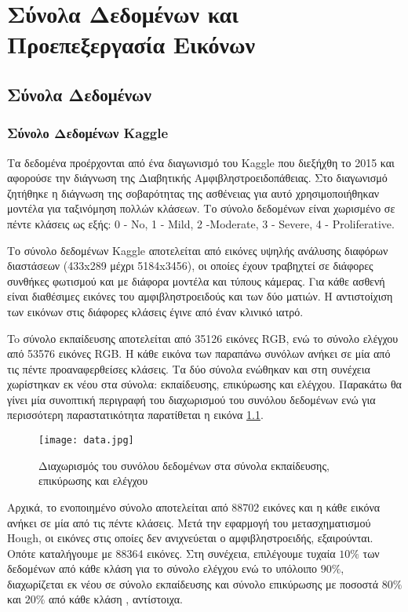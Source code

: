 \thispagestyle{plain}
\chapter{Σύνολα Δεδομένων και Προεπεξεργασία Εικόνων}
\label{chap:4}
\section{Σύνολα Δεδομένων}
\label{sec:4.1}

\subsection{Σύνολο Δεδομένων Kaggle}
\label{subsec:4.1.1}
Τα δεδομένα προέρχονται από ένα διαγωνισμό του Κaggle που διεξήχθη το 2015 και αφορούσε την διάγνωση της Διαβητικής Αμφιβληστροειδοπάθειας\cite{Kaggle}. Στο διαγωνισμό ζητήθηκε η διάγνωση της σοβαρότητας της ασθένειας για αυτό χρησιμοποιήθηκαν μοντέλα για ταξινόμηση πολλών κλάσεων. Το σύνολο δεδομένων είναι χωρισμένο σε πέντε κλάσεις ως εξής: 0 - No, 1 - Mild, 2 -Moderate, 3 - Severe, 4 - Proliferative.

Το σύνολο δεδομένων Kaggle αποτελείται από εικόνες υψηλής ανάλυσης διαφόρων διαστάσεων (433x289 μέχρι 5184x3456), οι οποίες έχουν τραβηχτεί σε διάφορες συνθήκες φωτισμού και με διάφορα μοντέλα και τύπους κάμερας. Για κάθε ασθενή είναι διαθέσιμες εικόνες του αμφιβληστροειδούς και των δύο ματιών. Η αντιστοίχιση των εικόνων στις διάφορες κλάσεις έγινε από έναν κλινικό ιατρό.

To σύνολο εκπαίδευσης αποτελείται από 35126 εικόνες RGB, ενώ το σύνολο ελέγχου από 53576 εικόνες RGB. H κάθε εικόνα των παραπάνω συνόλων ανήκει σε μία από τις πέντε προαναφερθείσες κλάσεις. Τα δύο σύνολα ενώθηκαν και στη συνέχεια χωρίστηκαν εκ νέου στα σύνολα: εκπαίδευσης,  επικύρωσης και ελέγχου. Παρακάτω θα γίνει μία συνοπτική περιγραφή του διαχωρισμού του συνόλου δεδομένων ενώ για περισσότερη παραστατικότητα παρατίθεται η εικόνα \ref{figure:data}.
\begin{figure}[!h]
    \centering
      \texttt{[image: data.jpg]} \caption{ Διαχωρισμός του συνόλου δεδομένων στα σύνολα εκπαίδευσης, επικύρωσης και ελέγχου}
\label{figure:data}    
  \end{figure}

Αρχικά, το ενοποιημένο σύνολο αποτελείται από 88702 εικόνες και η κάθε εικόνα ανήκει σε μία από τις πέντε κλάσεις. Μετά την εφαρμογή του μετασχηματισμού Hough,  οι εικόνες στις οποίες δεν ανιχνεύεται ο αμφιβληστροειδής, εξαιρούνται. Οπότε καταλήγουμε με 88364 εικόνες. Στη συνέχεια, επιλέγουμε τυχαία $10\%$ των δεδομένων από κάθε κλάση για το σύνολο ελέγχου ενώ το υπόλοιπο $90\%$, διαχωρίζεται εκ νέου σε σύνολο εκπαίδευσης και σύνολο επικύρωσης με ποσοστά $80\%$ και $20\%$ από κάθε κλάση , αντίστοιχα.


